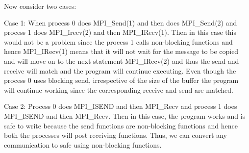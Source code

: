 \documentclass[12pt]{book}
\begin{document}
Now consider two cases:

Case 1: When process 0 does MPI\_Send(1) and then does MPI\_Send(2) and process 1 does MPI\_Irecv(2) and then MPI\_IRecv(1). Then in this case this would not be a problem since the process 1 calls non-blocking functions and hence MPI\_IRecv(1) means that it will not wait for the message to be copied and will move on to the next statement MPI\_IRecv(2) and thus the send and receive will match and the program will continue executing. Even though the process 0 uses blocking send, irrespective of the size of the buffer the program will continue working since the corresponding receive and send are matched.

Case 2: Process 0 does MPI\_ISEND and then MPI\_Recv and process 1 does MPI\_ISEND and then MPI\_Recv. Then in this case, the program works and is safe to write because the send functions are non-blocking functions and hence both the processes will post receiving functions. Thus, we can convert any communication to safe using non-blocking functions.
\end{document}
